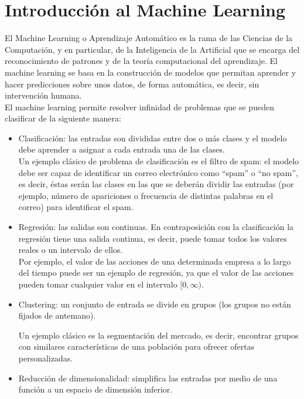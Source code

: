 \chapter{Introducción al Machine Learning}

El Machine Learning o Aprendizaje Automático es la rama de las Ciencias de la Computación, y en particular, de la Inteligencia de la Artificial que se encarga del reconocimiento de patrones y de la teoría computacional del aprendizaje. El machine learning se basa en la construcción de modelos que permitan aprender y hacer predicciones sobre unos datos, de forma automática, es decir, sin intervención humana.\\

El machine learning permite resolver infinidad de problemas que se pueden clasificar de la siguiente manera:

\begin{itemize}
	\item Clasificación: las entradas son divididas entre dos o más clases y el modelo debe aprender a asignar a cada entrada una de las clases.\\
	
	
	Un ejemplo clásico de problema de clasificación es el filtro de spam: el modelo debe ser capaz de identificar un correo electrónico como ``spam'' o ``no spam'', es decir, éstas serán las clases en las que se deberán dividir las entradas (por ejemplo, número de apariciones o frecuencia de distintas palabras en el correo) para identificar el spam.
	
	\item Regresión: las salidas son continuas. En contraposición con la clasificación la regresión tiene una salida continua, es decir, puede tomar todos los valores reales o un intervalo de ellos.\\
	
	Por ejemplo, el valor de las acciones de una determinada empresa a lo largo del tiempo puede ser un ejemplo de regresión, ya que el valor de las acciones pueden tomar cualquier valor en el intervalo $[0, \infty)$.
	
	\item Clustering: un conjunto de entrada se divide en grupos (los grupos no están fijados de antemano).
	
	Un ejemplo clásico es la segmentación del mercado, es decir, encontrar grupos con similares características de una población para ofrecer ofertas personalizadas.
	
	\item Reducción de dimensionalidad: simplifica las entradas por medio de una función a un espacio de dimensión inferior.    
\end{itemize}

